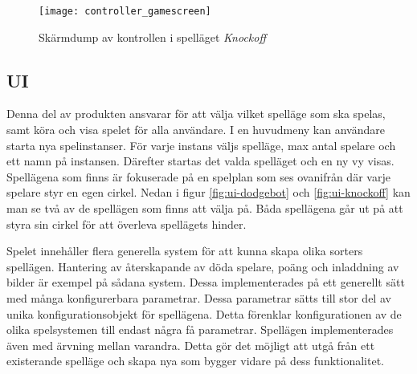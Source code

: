 \begin{figure}[H]
    \centering
    \texttt{[image: controller\_gamescreen]}
    \caption{Skärmdump av kontrollen i spelläget \textit{Knockoff}}
    \label{fig:controller_gamescreen}
\end{figure}

\subsection{UI}
Denna del av produkten ansvarar för att välja vilket spelläge som ska spelas, samt köra och visa spelet för alla användare. I en huvudmeny kan användare starta nya spelinstanser. För varje instans väljs spelläge, max antal spelare och ett namn på instansen. Därefter startas det valda spelläget och en ny vy visas. Spellägena som finns är fokuserade på en spelplan som ses ovanifrån där varje spelare styr en egen cirkel. Nedan i figur \ref{fig:ui-dodgebot} och \ref{fig:ui-knockoff} kan man se två av de spellägen som finns att välja på. Båda spellägena går ut på att styra sin cirkel för att överleva spellägets hinder.

Spelet innehåller flera generella system för att kunna skapa olika sorters spellägen. Hantering av återskapande av döda spelare, poäng och inladdning av bilder är exempel på sådana system. Dessa implementerades på ett generellt sätt med många konfigurerbara parametrar. Dessa parametrar sätts till stor del av unika konfigurationsobjekt för spellägena. Detta förenklar konfigurationen av de olika spelsystemen till endast några få parametrar. Spellägen implementerades även med ärvning mellan varandra. Detta gör det möjligt att utgå från ett existerande spelläge och skapa nya som bygger vidare på dess funktionalitet.

